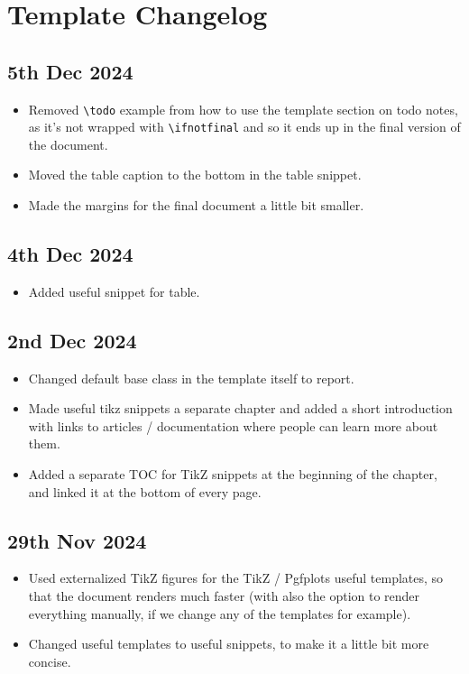 \chapter*{Template Changelog}

\section*{5th Dec 2024} \label{sec:changelog:2024/12/05}
\begin{itemize}
    \item Removed \verb|\todo| example from how to use the template section on todo notes, as it's not wrapped with \verb|\ifnotfinal| and so it ends up in the final version of the document.
    \item Moved the table caption to the bottom in the table snippet.
    \item Made the margins for the final document a little bit smaller.
\end{itemize}

\section*{4th Dec 2024} \label{sec:changelog:2024/12/04}
\begin{itemize}
    \item Added useful snippet for table.
\end{itemize}

\section*{2nd Dec 2024} \label{sec:changelog:2024/12/02}
\begin{itemize}
    \item Changed default base class in the template itself to report.
    \item Made useful tikz snippets a separate chapter and added a short introduction with links to articles / documentation where people can learn more about them.
    \item Added a separate TOC for TikZ snippets at the beginning of the chapter, and linked it at the bottom of every page.
\end{itemize}

\section*{29th Nov 2024} \label{sec:changelog:2024/11/29}
\begin{itemize}
    \item Used externalized TikZ figures for the TikZ / Pgfplots useful templates, so that the document renders much faster (with also the option to render everything manually, if we change any of the templates for example).
    \item Changed useful templates to useful snippets, to make it a little bit more concise.
\end{itemize}


